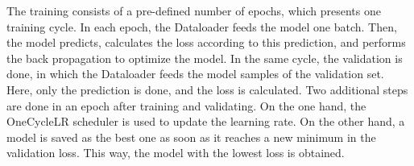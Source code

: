\noindent The training consists of a pre-defined number of epochs, which presents one training cycle.
In each epoch, the Dataloader feeds the model one batch.
Then, the model predicts, calculates the loss according to this prediction, and performs the back propagation to optimize the model.
In the same cycle, the validation is done, in which the Dataloader feeds the model samples of the validation set.
Here, only the prediction is done, and the loss is calculated.
Two additional steps are done in an epoch after training and validating.
On the one hand, the OneCycleLR scheduler \cite{pytorch_oneCycleLR_docu} is used to update the learning rate.
On the other hand, a model is saved as the best one as soon as it reaches a new minimum in the validation loss.
This way, the model with the lowest loss is obtained.
